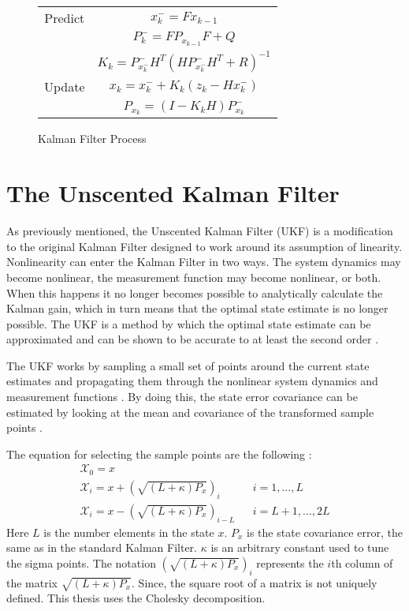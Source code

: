 \begin{figure}
\begin{center}
\begin{tabular}{ | c | c | } 
	\hline
	Predict & $x^-_{k} = Fx_{k-1}$ \\
	\space	& $P^-_{k} = FP_{x_{k-1}}F + Q $ \\ 
	\hline \space & $K_{k} = P^-_{x^-_k}H^T(HP^-_{x^-_k}H^T + R)^{-1}$ \\
	Update & $x_{k} = x^-_{k} + K_k(z_k - Hx^-_k)$ \\ 
	\space & $P_{x_k} = (I - K_kH)P^-_{x_k}$ \\ 
	\hline
\end{tabular}
\end{center}
\caption{Kalman Filter Process}
\end{figure}


\section{The Unscented Kalman Filter}

As previously mentioned, the Unscented Kalman Filter (UKF) is a modification to the original Kalman Filter designed to work around its assumption of linearity. Nonlinearity can enter the Kalman Filter in two ways. The system dynamics may become nonlinear, the measurement function may become nonlinear, or both. When this happens it no longer becomes possible to analytically calculate the Kalman gain, which in turn means that the optimal state estimate is no longer possible. The UKF is a method by which the optimal state estimate can be approximated and can be shown to be accurate to at least the second order \cite{ukf_merwe}.

The UKF works by sampling a small set of points around the current state estimates and propagating them through the nonlinear system dynamics and measurement functions \cite{ukf_merwe}. By doing this, the state error covariance can be estimated by looking at the mean and covariance of the transformed sample points \cite{ukf_merwe}.



The equation for selecting the sample points are the following \cite{Julier_sigma}:
\begin{align}
\mathcal{X}_0 = x \\
\mathcal{X}_i = x + (\sqrt{(L + \kappa)P_x})_i && i = 1,...,L \\
\mathcal{X}_i = x - (\sqrt{(L + \kappa)P_x})_{i-L} && i = L+1,...,2L
\end{align}
Here $L$ is the number elements in the state $x$. $P_x$ is the state covariance error, the same as in the standard Kalman Filter. $\kappa$ is an arbitrary constant used to tune the sigma points. The notation $(\sqrt{(L + \kappa)P_x})_i$ represents the $i$th column of the matrix $\sqrt{(L + \kappa)P_x}$. Since, the square root of a matrix is not uniquely defined. This thesis uses the Cholesky decomposition.

